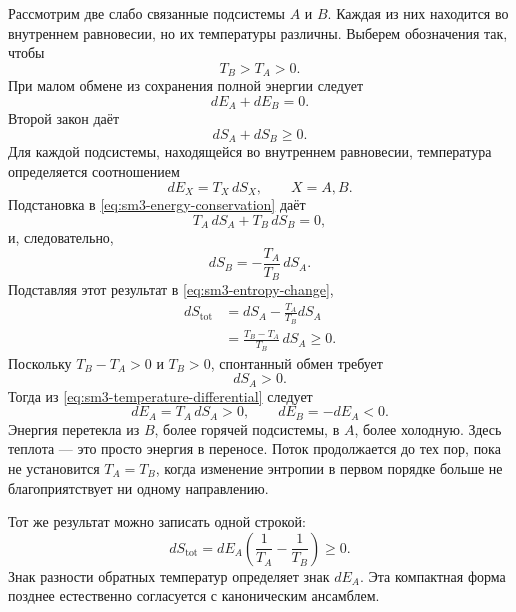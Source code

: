 Рассмотрим две слабо связанные подсистемы \(A\) и \(B\). Каждая из них находится во внутреннем равновесии, но их температуры различны. Выберем обозначения так, чтобы
\begin{equation}
 T_B>T_A>0.
 \label{eq:sm3-temperature-order}
\end{equation}
При малом обмене из сохранения полной энергии следует
\begin{equation}
 dE_A+dE_B=0.
 \label{eq:sm3-energy-conservation}
\end{equation}
Второй закон даёт
\begin{equation}
 dS_A+dS_B\geq0.
 \label{eq:sm3-entropy-change}
\end{equation}
Для каждой подсистемы, находящейся во внутреннем равновесии, температура определяется соотношением
\begin{equation}
 dE_X=T_X\,dS_X,
 \qquad X=A,B.
 \label{eq:sm3-temperature-differential}
\end{equation}
Подстановка в \eqref{eq:sm3-energy-conservation} даёт
\begin{equation}
 T_A\,dS_A+T_B\,dS_B=0,
\end{equation}
и, следовательно,
\begin{equation}
 dS_B=-\frac{T_A}{T_B}\,dS_A.
 \label{eq:sm3-dsb}
\end{equation}
Подставляя этот результат в \eqref{eq:sm3-entropy-change},
\begin{align}
 dS_{\mathrm{tot}}
 &=dS_A-\frac{T_A}{T_B}dS_A\\
 &=\frac{T_B-T_A}{T_B}\,dS_A\geq0.
 \label{eq:sm3-flow-entropy}
\end{align}
Поскольку \(T_B-T_A>0\) и \(T_B>0\), спонтанный обмен требует
\[
 dS_A>0.
\]
Тогда из \eqref{eq:sm3-temperature-differential} следует
\begin{equation}
 dE_A=T_A\,dS_A>0,
 \qquad
 dE_B=-dE_A<0.
 \label{eq:sm3-hot-to-cold}
\end{equation}
Энергия перетекла из \(B\), более горячей подсистемы, в \(A\), более холодную. Здесь теплота — это просто энергия в переносе. Поток продолжается до тех пор, пока не установится \(T_A=T_B\), когда изменение энтропии в первом порядке больше не благоприятствует ни одному направлению.

Тот же результат можно записать одной строкой:
\begin{equation}
 dS_{\mathrm{tot}}
 =dE_A\left(\frac{1}{T_A}-\frac{1}{T_B}\right)\geq0.
 \label{eq:sm3-compact-flow}
\end{equation}
Знак разности обратных температур определяет знак \(dE_A\). Эта компактная форма позднее естественно согласуется с каноническим ансамблем.


